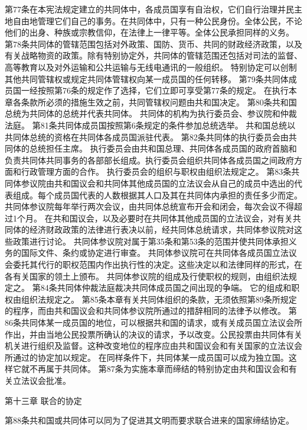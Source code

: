     第77条在本宪法规定建立的共同体中，各成员国享有自治权，它们自行治理并民主地自由地管理它们自己的事务。在共同体中，只有一种公民身份。全体公民，不论他们的出身、种族或宗教信仰，在法律上一律平等。全体公民承担同样的义务。
    第78条共同体的管辖范围包括对外政策、国防、货币、共同的财政经济政策，以及有关战略物资的政策。除有特别协定外，共同体的管辖范围还包括对司法的监督、高等教育以及对外运输和公共运输与无线电通讯的一般组织。
    特别协定可以创制其他共同管辖权或规定共同体管辖权向某一成员国的任何转移。
    第79条共同体成员国一经按照第76条的规定作了选择，它们立即可享受第77条的规定。
    在执行本章各条款所必须的措施生效之前，共同管辖权问题由共和国决定。
    第80条共和国总统为共同体的总统并代表共同体。
    共同体的机构为执行委员会、参议院和仲裁法庭。
    第81条共同体成员国按照第6条规定的条件参加总统选举。
    共和国总统以共同体总统的资格在共同体各成员国派驻代表。
    第82条共同体的执行委员会由共同体的总统担任主席。
    执行委员会由共和国总理、共同体各成员国的政府首脑和负责共同体共同事务的各部部长组成。执行委员会组织共同体各成员国之间政府方面和行政管理方面的合作。
    执行委员会的组织与职权由组织法规定之。
    第83条共同体参议院由共和国议会和共同体其他成员国的立法议会从自己的成员中选出的代表组成。每个成员国代表的人数根据其人口及其在共同体内承担的责任多少而定。
    共同体参议院每年举行两次会议，由共同体总统宣布开会和闭会，每次会议不得超过1个月。
    在共和国议会，以及必要时在共同体其他成员国的立法议会，对有关共同体的经济财政政策的法律进行表决以前，经共同体总统请求，共同体参议院对这些政策进行讨论。
    共同体参议院对属于第35条和第53条的范围并使共同体承担义务的国际文件、条约或协定进行审查。
    共同体参议院可在共同体各成员国立法议会委托其代行的职权范围内作出执行性的决定。这些决定以和法律同样的形式，在各有关国家的领土上颁布。
    共同体参议院的组成及行使职权的规则，由组织法规定之。
    第84条共同体仲裁法庭裁决共同体成员国之间出现的争端。
    它的组成和职权由组织法规定之。
    第85条本章有关共同体组织的条款，无须依照第89条所规定的程序，而由共和国议会和共同体参议院所通过的措辞相同的法律予以修改。
    第86条共同体某一成员国的地位，可以根据共和国的请求，或有关成员国立法议会所作出，并由当地公民投票所确认的决议的请求，予以改变。公民投票由共同体有关机关进行组织及监督。这种改变地位的程序应由共和国议会和有关国家的立法议会所通过的协定加以规定。
    在同样条件下，共同体某一成员国可以成为独立国。这样它就不再属于共同体。
    第87条为实施本章而缔结的特别协定由共和国议会和有关立法议会批准。
 
                     第十三章    联合的协定
 
    第88条共和国或共同体可以同为了促进其文明而要求联合进来的国家缔结协定。
                    

